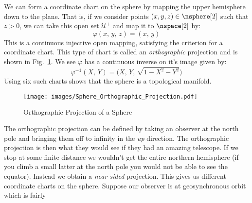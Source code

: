 \documentclass{book}                                                           %
\begin{document}
                \begin{example}
                    We can form a coordinate chart on the sphere by mapping the
                    upper hemisphere down to the plane. That is, if we consider
                    points $(x,y,z)\in\nsphere[2]$ such that $z>0$, we can take
                    this open set $\mathcal{U}^{+}$ and map it to $\nspace[2]$
                    by:
                    \begin{equation}
                        \varphi(x,\,y,\,z)=(x,\,y)
                    \end{equation}
                    This is a continuous injective open mapping, satisfying the
                    criterion for a coordinate chart. This type of chart is
                    called an \textit{orthographic} projection and is shown in
                    Fig.~\ref{fig:Sphere_Orthographic_Projection}. We see
                    $\varphi$ has a continuous inverse on it's image given by:
                    \begin{equation}
                        \varphi^{\minus{1}}(X,\,Y)=
                            \big(X,\,Y,\,\sqrt{1-X^{2}-Y^{2}}\big)
                    \end{equation}
                    Using six such charts shows that the sphere is a topological
                    manifold.
                \end{example}
                \begin{figure}[H]
                    \centering
                    \captionsetup{type=figure}
                    \texttt{[image: images/Sphere\_Orthographic\_Projection.pdf]}
                    \caption{Orthographic Projection of a Sphere}
                    \label{fig:Sphere_Orthographic_Projection}
                \end{figure}
                The orthographic projection can be defined by taking an observer
                at the north pole and bringing them off to infinity in the
                \textit{up} direction. The orthographic projection is then what
                they would see if they had an amazing telescope. If we stop at
                some finite distance we wouldn't get the entire northern
                hemisphere (if you climb a small latter at the north pole you
                would not be able to see the equator). Instead we obtain a
                \textit{near-sided} projection. This gives us different
                coordinate charts on the sphere.
                Suppose our observer is at geosynchronous orbit which is fairly
\end{document}
